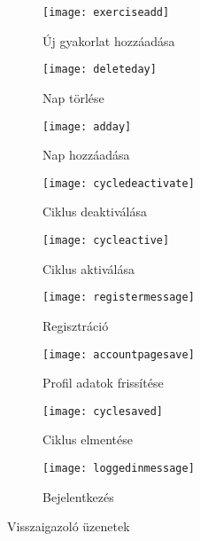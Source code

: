 \begin{figure}[htbp]
	\begin{subfigure}[b]{0.3\textwidth}
			\centering
			\texttt{[image: exerciseadd]}
			\caption{Új gyakorlat hozzáadása}
			\label{fig:exerciseadd}
	\end{subfigure}
	\hfill
	\begin{subfigure}[b]{0.3\textwidth}
			\centering
			\texttt{[image: deleteday]}
			\caption{Nap törlése}
			\label{fig:deleteday}
	\end{subfigure}
	\hfill
	\begin{subfigure}[b]{0.3\textwidth}
			\centering
			\texttt{[image: adday]}
			\caption{Nap hozzáadása}
			\label{fig:adday}
	\end{subfigure}
	
	\medskip
	
	\begin{subfigure}[b]{0.3\textwidth}
			\centering
			\texttt{[image: cycledeactivate]}
			\caption{Ciklus deaktiválása}
			\label{fig:cycledeactivate}
	\end{subfigure}
	\hfill
	\begin{subfigure}[b]{0.3\textwidth}
			\centering
			\texttt{[image: cycleactive]}
			\caption{Ciklus aktiválása}
			\label{fig:cycleactive}
	\end{subfigure}
	\hfill
	\begin{subfigure}[b]{0.3\textwidth}
			\centering
			\texttt{[image: registermessage]}
			\caption{Regisztráció}
			\label{fig:registermessage}
	\end{subfigure}
	
	\medskip
	
	\begin{subfigure}[b]{0.3\textwidth}
			\centering
			\texttt{[image: accountpagesave]}
			\caption{Profil adatok frissítése}
			\label{fig:accountpagesave}
	\end{subfigure}
	\hfill
	\begin{subfigure}[b]{0.3\textwidth}
			\centering
			\texttt{[image: cyclesaved]}
			\caption{Ciklus elmentése}
			\label{fig:cyclesaved}
	\end{subfigure}
	\hfill
	\begin{subfigure}[b]{0.3\textwidth}
			\centering
			\texttt{[image: loggedinmessage]}
			\caption{Bejelentkezés}
			\label{fig:loggedinmessage}
	\end{subfigure}
	
	\caption{Visszaigazoló üzenetek}
	\label{fig:visszaigazolo}
\end{figure}

